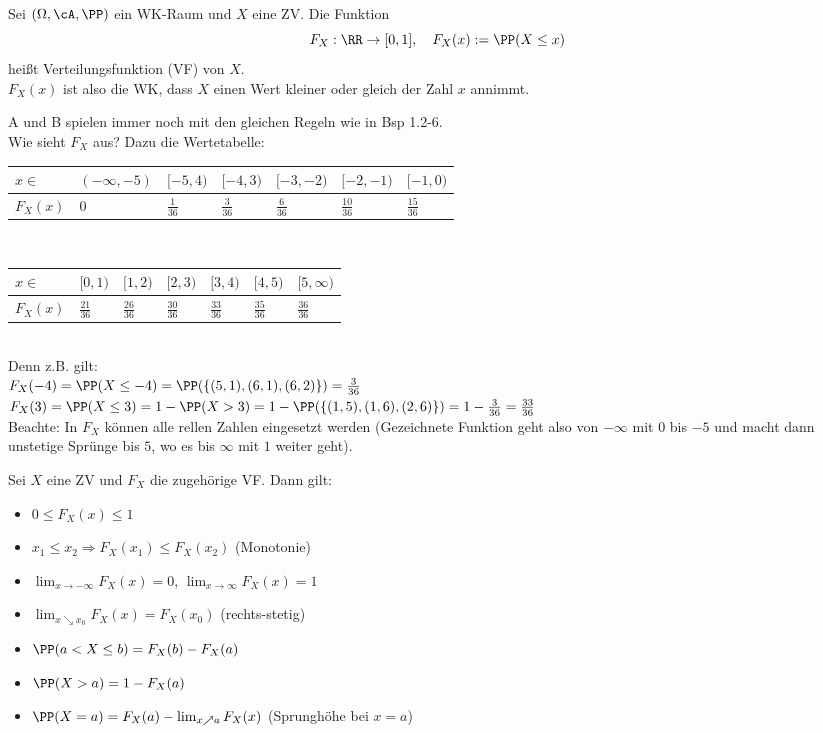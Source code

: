  Sei $(\Omega, \cA, \PP)$ ein WK-Raum und $X$ eine ZV. Die Funktion
$$F_X: \RR\to [0,1], \quad F_X(x):=\PP(X \leq x)$$
heißt Verteilungsfunktion (VF) von $X$.\\
$F_X(x)$ ist also die WK, dass $X$ einen Wert kleiner oder gleich der Zahl $x$ annimmt.

 A und B spielen immer noch mit den gleichen Regeln wie in Bsp 1.2-6.\\
Wie sieht $F_X$ aus? Dazu die Wertetabelle:\\
\begin{tabular}{L{0.13}|L{0.13}|L{0.13}|L{0.13}|L{0.13}|L{0.13}|L{0.13}}
$x\in$ & $(-\infty,-5)$ & $[-5,4)$ & $[-4,3)$& $[-3,-2)$ & $[-2,-1)$ & $[-1,0)$\\
\hline
$F_X(x)$ & $0$ & $\tfrac{1}{36}$ & $\tfrac{3}{36}$ & $\tfrac{6}{36}$ & $\tfrac{10}{36}$ & $\tfrac{15}{36}$ 
\end{tabular}\smallskip\\
\begin{tabular}{L{0.13}|L{0.13}|L{0.13}|L{0.13}|L{0.13}|L{0.13}|L{0.13}}
$x\in$ & $[0,1)$ & $[1,2)$ & $[2,3)$ & $[3,4)$ & $[4,5)$ & $[5,\infty)$\\
\hline
$F_X(x)$ & $\tfrac{21}{36}$ & $\tfrac{26}{36}$ & $\tfrac{30}{36}$ & $\tfrac{33}{36}$ & $\tfrac{35}{36}$ & $\tfrac{36}{36}$
\end{tabular}\smallskip\\
Denn z.B. gilt:\\
$F_X(-4) = \PP(X \leq -4) = \PP(\{(5,1),(6,1), (6,2)\}) = \frac{3}{36}$\\
$F_X(3) = \PP(X \leq 3 ) = 1- \PP(X>3) = 1 - \PP(\{(1,5),(1,6),(2,6)\})=1-\frac{3}{36}=\frac{33}{36}$\\
Beachte: In $F_X$ können alle rellen Zahlen eingesetzt werden (Gezeichnete Funktion geht also von $-\infty$ mit $0$ bis $-5$ und macht dann unstetige Sprünge bis $5$, wo es bis $\infty$ mit $1$ weiter geht).

 Sei $X$ eine ZV und $F_X$ die zugehörige VF. Dann gilt:
\begin{itemize}
\item $0\leq F_X (x) \leq 1$
\item $x_1 \leq x_2 \Rightarrow F_X(x_1) \leq F_X(x_2)$ \tab(Monotonie)
\item $\lim_{x\to -\infty} F_X(x) =0$, $\lim_{x\to\infty} F_X(x) = 1$
\item $\lim_{x \searrow x_0} F_X(x)=F_X(x_0)$ \tab\tab(rechts-stetig)
\item $\PP(a <X\leq b)=F_X(b)-F_X(a)$
\item $\PP(X>a) = 1 - F_X(a)$
\item $\PP(X=a)=F_X(a)-\lim_{x\nearrow a}F_X(x)$ \tab (Sprunghöhe bei $x=a$)
\end{itemize}


